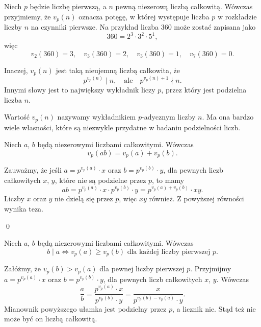 


\noindent
Niech $p$ będzie liczbę pierwszą, a $n$ pewną niezerową liczbą całkowitą. Wówczas przyjmiemy, że $v_p(n)$ oznacza potęgę, w której występuje liczba $p$ w rozkładzie liczby $n$ na czynniki pierwsze. Na przykład liczba $360$ może zostać zapisana jako
\[
	360 = 2^3 \cdot 3^2 \cdot 5^1,
\]
więc
\[
	v_2(360) = 3, \quad v_3(360) = 2, \quad v_3(360) = 1, \quad v_7(360) = 0.
\]

\vspace{10px}

\noindent
Inaczej, $v_p(n)$ jest taką nieujemną liczbą całkowita, że 
\[
	p^{v_p(n)} \mid n, \quad \text{ale} \quad p^{v_p(n) + 1} \nmid n.
\]
Innymi słowy jest to największy wykładnik liczy $p$, przez który jest podzielna liczba $n$.


\vspace{10px}

\noindent
Wartość $v_p(n)$ nazywamy wykładnikiem $p$-adycznym liczby $n$. Ma ona bardzo wiele własności, które są niezwykle przydatne w badaniu podzielności liczb.

\vspace{10px}


\noindent
Niech $a$, $b$ będą niezerowymi liczbami całkowitymi. Wówczas
\[
	v_p(ab) = v_p(a) + v_p(b).
\]


\noindent
Zauważmy, że jeśli $a = p^{v_p(a)} \cdot x$ oraz $b = p^{v_p(b)} \cdot y$, dla pewnych liczb całkowitych $x$, $y$, które nie są podzielne przez $p$, to mamy
\[
	ab = p^{v_p(a)} \cdot x \cdot p^{v_p(b)} \cdot y = p^{v_p(a) + v_p(b)} \cdot xy.
\] 
Liczby $x$ oraz $y$ nie dzielą się przez $p$, więc $xy$ również. Z powyższej równości wynika teza. 

\qed

\vspace{10px}


\noindent
Niech $a$, $b$ będą niezerowymi liczbami całkowitymi. Wówczas 
\[
	b \mid a \iff v_p(a) \geqslant v_p(b) \text{ dla każdej liczby pierwszej $p$.}
\]


\noindent
Załóżmy, że $v_p(b) > v_p(a)$ dla pewnej liczby pierwszej $p$. Przyjmijmy $a = p^{v_p(a)} \cdot x$ oraz $b = p^{v_p(b)} \cdot y$, dla pewnych liczb całkowitych $x$, $y$. Wówczas
\[
	\frac{a}{b} = \frac{p^{v_p(a)} \cdot x}{p^{v_p(b)} \cdot y}= \frac{x}{p^{v_p(b) - v_p(a)} \cdot y}.
\]
Mianownik powyższego ułamka jest podzielny przez $p$, a licznik nie. Stąd też nie może być on liczbą całkowitą.

